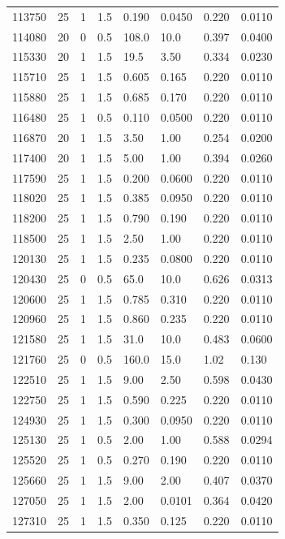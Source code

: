 \documentclass[preview]{standalone}
\begin{document}
{{{{{{\begin{tabular}{L{1.2cm}C{1.2cm} C{0.3cm}C{0.5cm} C{1.4cm}C{1.4cm} C{1.4cm}C{1.4cm}}
  113750  &    25  & 1     & 1.5 &  0.190  & 0.0450  & 0.220 &  0.0110   \\ 
  114080  &    20  & 0     & 0.5 &  108.0  & 10.0  & 0.397 &  0.0400   \\ 
  115330  &    20  & 1     & 1.5 &  19.5  & 3.50  & 0.334 &  0.0230   \\ 
  115710  &    25  & 1     & 1.5 &  0.605  & 0.165  & 0.220 &  0.0110   \\ 
  115880  &    25  & 1     & 1.5 &  0.685  & 0.170  & 0.220 &  0.0110   \\ 
  116480  &    25  & 1     & 0.5 &  0.110  & 0.0500  & 0.220 &  0.0110   \\ 
  116870  &    20  & 1     & 1.5 &  3.50  & 1.00  & 0.254 &  0.0200   \\ 
  117400  &    20  & 1     & 1.5 &  5.00  & 1.00  & 0.394 &  0.0260   \\ 
  117590  &    25  & 1     & 1.5 &  0.200  & 0.0600  & 0.220 &  0.0110   \\ 
  118020  &    25  & 1     & 1.5 &  0.385  & 0.0950  & 0.220 &  0.0110   \\ 
  118200  &    25  & 1     & 1.5 &  0.790  & 0.190  & 0.220 &  0.0110   \\ 
  118500  &    25  & 1     & 1.5 &  2.50  & 1.00  & 0.220 &  0.0110   \\ 
  120130  &    25  & 1     & 1.5 &  0.235  & 0.0800  & 0.220 &  0.0110   \\ 
  120430  &    25  & 0     & 0.5 &  65.0  & 10.0  & 0.626 &  0.0313   \\ 
  120600  &    25  & 1     & 1.5 &  0.785  & 0.310  & 0.220 &  0.0110   \\ 
  120960  &    25  & 1     & 1.5 &  0.860  & 0.235  & 0.220 &  0.0110   \\ 
  121580  &    25  & 1     & 1.5 &  31.0  & 10.0  & 0.483 &  0.0600   \\ 
  121760  &    25  & 0     & 0.5 &  160.0  & 15.0  & 1.02 &  0.130   \\ 
  122510  &    25  & 1     & 1.5 &  9.00  & 2.50  & 0.598 &  0.0430   \\ 
  122750  &    25  & 1     & 1.5 &  0.590  & 0.225  & 0.220 &  0.0110   \\ 
  124930  &    25  & 1     & 1.5 &  0.300  & 0.0950  & 0.220 &  0.0110   \\ 
  125130  &    25  & 1     & 0.5 &  2.00  & 1.00  & 0.588 &  0.0294   \\ 
  125520  &    25  & 1     & 0.5 &  0.270  & 0.190  & 0.220 &  0.0110   \\ 
  125660  &    25  & 1     & 1.5 &  9.00  & 2.00  & 0.407 &  0.0370   \\ 
  127050  &    25  & 1     & 1.5 &  2.00  & 0.0101  & 0.364 &  0.0420   \\ 
  127310  &    25  & 1     & 1.5 &  0.350  & 0.125  & 0.220 &  0.0110   \\ 
\hline 
\end{tabular} 

}}}}}}
\end{document}
